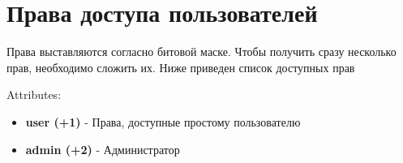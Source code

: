 \section{Права доступа пользователей}
\par
Права выставляются согласно битовой маске. Чтобы получить сразу несколько прав, необходимо сложить их.
Ниже приведен список доступных прав


Attributes:
\begin{itemize}
  \item \textbf{user (+1)} - Права, доступные простому пользователю
  \item \textbf{admin (+2)} - Администратор
\end{itemize}
